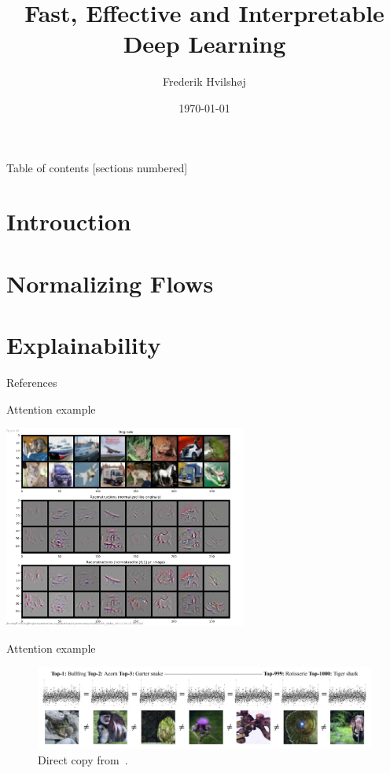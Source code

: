 \documentclass[10pt,aspectratio=169]{beamer}
\title{Fast, Effective and Interpretable Deep Learning}
\date{\today}
\author{Frederik Hvilshøj}
\begin{document}
\maketitle

\begin{frame}{Table of contents}
  [sections numbered]
  \tableofcontents[hideallsubsections]
\end{frame}

\section{Introuction}


\section{Normalizing Flows}


\section{Explainability}



\appendix
\begin{frame}[t, allowframebreaks]{References}
	 
	\begingroup
	\renewcommand{\section}[2]{}%
	\footnotesize
	
	\endgroup

\end{frame}

\begin{frame}{Attention example}
	\begin{center}
		\includegraphics[width=0.6\textwidth]{ex1}
	\end{center}
\end{frame}

\begin{frame}{Attention example}
	\begin{figure}
		\centering
		\includegraphics[width=\textwidth]{excessive}
		\caption{Direct copy from~\cite{Jacobsen2019}.}
	\end{figure}
\end{frame}
\end{document}
